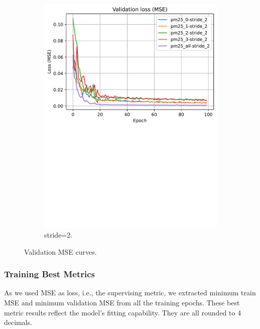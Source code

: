 \begin{figure}[!htbp]
\begin{subfigure}[!htbp]{.45\textwidth}
        \includegraphics[width=\textwidth]{fig/results/val_curves_stride_2.pdf}
        \caption{stride=2.}
        \label{fig:val_stride_2}
    \end{subfigure}
\caption{Validation MSE curves.}
\label{fig:val_mse}
\end{figure}


\subsubsection{Training Best Metrics}

As we used MSE as loss, i.e., the supervising metric, we extracted minimum train MSE and minimum validation MSE from all the training epochs. These best metric results reflect the model's fitting capability. They are all rounded to 4 decimals. 

